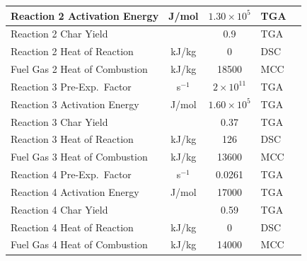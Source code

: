\begin{longtable}{@{\extracolsep{\fill}}|l|c|c|l|l|}
Reaction 2 Activation Energy     & J/mol         & $1.30\times 10^5$                       & TGA                                       & \cite{McKinnon:CF2013}                \\ \hline
Reaction 2 Char Yield             &               & 0.9                                       & TGA                                       & \cite{McKinnon:CF2013}                \\ \hline
Reaction 2 Heat of Reaction       & kJ/kg         & 0                                       & DSC                                       & \cite{McKinnon:CF2013}                \\ \hline
Fuel Gas 2 Heat of Combustion     & kJ/kg         & 18500                                   & MCC                                       & \cite{McKinnon:CF2013}                \\ \hline
Reaction 3 Pre-Exp.~Factor        & s$^{-1}$     & $2\times 10^{11}$                      & TGA                                       & \cite{McKinnon:CF2013}                \\ \hline
Reaction 3 Activation Energy     & J/mol         & $1.60\times 10^5$                       & TGA                                       & \cite{McKinnon:CF2013}                \\ \hline
Reaction 3 Char Yield             &               & 0.37                                   & TGA                                       & \cite{McKinnon:CF2013}                \\ \hline
Reaction 3 Heat of Reaction         & kJ/kg         & 126                                    & DSC                                       & \cite{McKinnon:CF2013}                \\ \hline
Fuel Gas 3 Heat of Combustion     & kJ/kg         & 13600                                   & MCC                                       & \cite{McKinnon:CF2013}                \\ \hline
Reaction 4 Pre-Exp.~Factor        & s$^{-1}$     & 0.0261                                   & TGA                                       & \cite{McKinnon:CF2013}                \\ \hline
Reaction 4 Activation Energy     & J/mol         & 17000                                   & TGA                                       & \cite{McKinnon:CF2013}                \\ \hline
Reaction 4 Char Yield             &               & 0.59                                   & TGA                                       & \cite{McKinnon:CF2013}                \\ \hline
Reaction 4 Heat of Reaction         & kJ/kg         & 0                                       & DSC                                       & \cite{McKinnon:CF2013}                \\ \hline
Fuel Gas 4 Heat of Combustion     & kJ/kg         & 14000                                  & MCC                                       & \cite{McKinnon:CF2013}                \\ \hline
\end{longtable}

